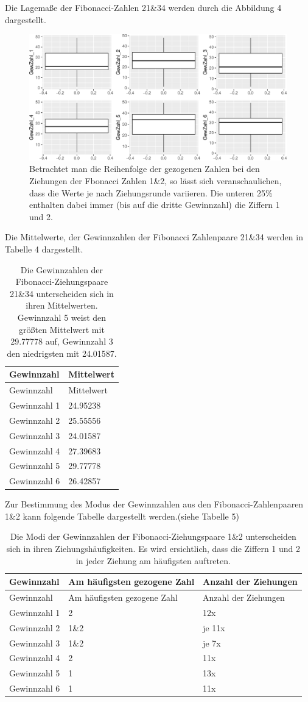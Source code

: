 \documentclass[ngerman,]{article}
\begin{document}
Die Lagemaße der Fibonacci-Zahlen 21\&34 werden durch die Abbildung 4
dargestellt.

\begin{figure}

\includegraphics{Abbildung/c-1} \hfill{}

\caption{Betrachtet man die Reihenfolge der gezogenen Zahlen bei den Ziehungen der Fbonacci Zahlen 1\&2, so lässt sich veranschaulichen, dass die Werte je nach Ziehungsrunde variieren. Die unteren 25\% enthalten dabei immer (bis auf die dritte Gewinnzahl) die Ziffern 1 und 2.}\label{fig:c}
\end{figure}

Die Mittelwerte, der Gewinnzahlen der Fibonacci Zahlenpaare 21\&34
werden in Tabelle 4 dargestellt.

\begin{longtable}[]{@{}ll@{}}
\caption{Die Gewinnzahlen der Fibonacci-Ziehungspaare 21\&34
unterscheiden sich in ihren Mittelwerten. Gewinnzahl 5 weist den größten
Mittelwert mit 29.77778 auf, Gewinnzahl 3 den niedrigsten mit
24.01587.}\tabularnewline
\toprule
Gewinnzahl & Mittelwert\tabularnewline
\midrule
\endfirsthead
\toprule
Gewinnzahl & Mittelwert\tabularnewline
\midrule
\endhead
Gewinnzahl 1 & 24.95238\tabularnewline
Gewinnzahl 2 & 25.55556\tabularnewline
Gewinnzahl 3 & 24.01587\tabularnewline
Gewinnzahl 4 & 27.39683\tabularnewline
Gewinnzahl 5 & 29.77778\tabularnewline
Gewinnzahl 6 & 26.42857\tabularnewline
\bottomrule
\end{longtable}

Zur Bestimmung des Modus der Gewinnzahlen aus den Fibonacci-Zahlenpaaren
1\&2 kann folgende Tabelle dargestellt werden.(siehe Tabelle 5)

\begin{longtable}[]{@{}lll@{}}
\caption{Die Modi der Gewinnzahlen der Fibonacci-Ziehungspaare 1\&2
unterscheiden sich in ihren Ziehungshäufigkeiten. Es wird ersichtlich,
dass die Ziffern 1 und 2 in jeder Ziehung am häufigsten
auftreten.}\tabularnewline
\toprule
Gewinnzahl & Am häufigsten gezogene Zahl & Anzahl der
Ziehungen\tabularnewline
\midrule
\endfirsthead
\toprule
Gewinnzahl & Am häufigsten gezogene Zahl & Anzahl der
Ziehungen\tabularnewline
\midrule
\endhead
Gewinnzahl 1 & 2 & 12x\tabularnewline
Gewinnzahl 2 & 1\&2 & je 11x\tabularnewline
Gewinnzahl 3 & 1\&2 & je 7x\tabularnewline
Gewinnzahl 4 & 2 & 11x\tabularnewline
Gewinnzahl 5 & 1 & 13x\tabularnewline
Gewinnzahl 6 & 1 & 11x\tabularnewline
\bottomrule
\end{longtable}
\end{document}
